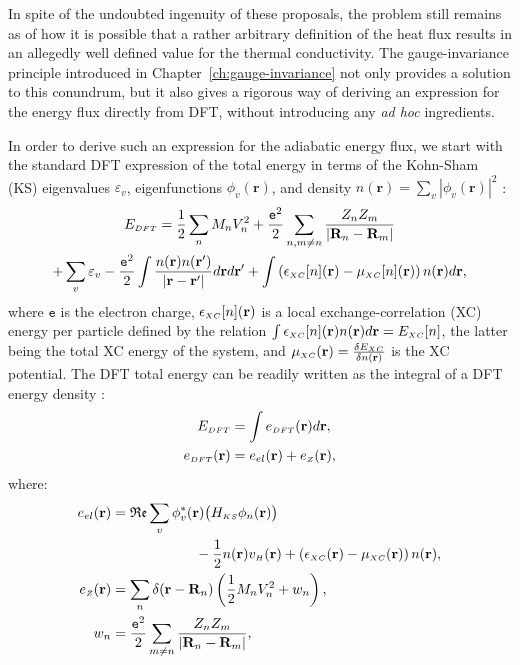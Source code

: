 In spite of the undoubted ingenuity of these proposals, the problem still remains as of how it is possible that a rather arbitrary definition of the heat flux results in an allegedly well defined value for the thermal conductivity. The gauge-invariance principle introduced in Chapter~\ref{ch:gauge-invariance} not only provides a solution to this conundrum, but it also gives a rigorous way of deriving an expression for the energy flux directly from DFT, without introducing any \emph{ad hoc} ingredients.

In order to derive such an expression for the adiabatic energy flux, we start with the standard DFT expression of the total energy in terms of the Kohn-Sham (KS) eigenvalues $\varepsilon_v$, eigenfunctions $\phi_v(\mathbf{r})$, and density $n(\mathbf{r}) = \sum_v |\phi_v(\mathbf{r})|^2$ \citep{Martin2008}:
\begin{multline}
  E_{{\scriptscriptstyle DFT}} = \frac{1}{2}\sum_{n}M_{n}V_{n}^{2} + \frac{\mathtt{e}^2}{2}\sum_{n,m\ne n}\frac{ Z_{n}Z_{m}}{|\mathbf{R}_{n}-\mathbf{R}_{m}|} \\
  + \sum_{v}\varepsilon_{v}-\frac{\mathtt{e}^2}{2}\int\frac{n(\mathbf{r})n(\mathbf{r}')}{|\mathbf{r}-\mathbf{r}'|}d\mathbf{r}d\mathbf{r}'+\int\left(\epsilon_{{\scriptscriptstyle XC}}[n](\mathbf{r})-\mu_{{\scriptscriptstyle XC}}[n](\mathbf{r})\right)n(\mathbf{r})d\mathbf{r},
\end{multline}
where $\mathtt{e}$ is the electron charge, $\epsilon_{\scriptscriptstyle XC}[n](\mathbf{r})$ is a local exchange-correlation (XC) energy per particle defined by the relation $ \int \epsilon_{\scriptscriptstyle XC}[n](\mathbf{r})n(\mathbf{r}) d\mathbf{r}=E_{\scriptscriptstyle XC} [n]$, the latter being the total XC energy of the system, and $ \mu_{\scriptscriptstyle XC} (\mathbf{r}) = \frac{\delta E_{\scriptscriptstyle XC} }{\delta n(\mathbf{r})}$ is the XC potential. The DFT total energy can be readily written as the integral of a DFT energy density \citep{Chetty1992}:
\begin{equation}
  \begin{aligned}
    E_{\smallDFT} & =  \int e_{\smallDFT}(\mathbf{r})d\mathbf{r},\\
    e_{\smallDFT}(\mathbf{r}) & = e_{el}(\mathbf{r})+e_{\smallZ}(\mathbf{r}),
  \end{aligned}
  \label{eq:DFT-Edensity}
\end{equation}
where:
\begin{align}
  e_{el}(\mathbf{r}) & =\mathfrak{Re} \sum_{v}\phi_{v}^{*}(\mathbf{r})\bigl(H_{\smallKS}\phi_{n}(\mathbf{r})\bigr) \nonumber \\
  & \qquad\qquad\qquad - \frac{1}{2}n(\mathbf{r})v_{\smallH}(\mathbf{r}) +\left(\epsilon_\smallXC (\mathbf{r}) - \mu_\smallXC  (\mathbf{r}) \right) n(\mathbf{r}), \\
  e_{\smallZ}(\mathbf{r}) & = \sum_{n}\delta(\mathbf{r}-\mathbf{R}_{n}) \left(\frac{1}{2}M_{n}V_{n}^{2}+w_{n}\right), \\
  w_{n} & =\frac{\mathtt{e}^2}{2}\sum_{m\ne n}\frac{ Z_{n}Z_{m}}{|\mathbf{R}_{n}-\mathbf{R}_{m}|}, \label{eq:DFT-Edensity-breakup}
\end{align}
